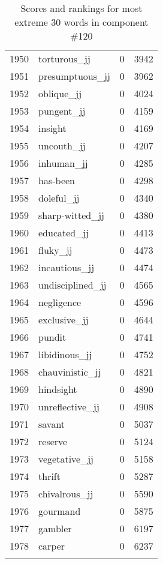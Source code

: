 \begin{longtable}[!htbp]{| rlr@{.}l |}
    1950 & torturous\_jj & 0 & 3942 \\
    1951 & presumptuous\_jj & 0 & 3962 \\
    1952 & oblique\_jj & 0 & 4024 \\
    1953 & pungent\_jj & 0 & 4159 \\
    1954 & insight & 0 & 4169 \\
    1955 & uncouth\_jj & 0 & 4207 \\
    1956 & inhuman\_jj & 0 & 4285 \\
    1957 & has-been & 0 & 4298 \\
    1958 & doleful\_jj & 0 & 4340 \\
    1959 & sharp-witted\_jj & 0 & 4380 \\
    1960 & educated\_jj & 0 & 4413 \\
    1961 & fluky\_jj & 0 & 4473 \\
    1962 & incautious\_jj & 0 & 4474 \\
    1963 & undisciplined\_jj & 0 & 4565 \\
    1964 & negligence & 0 & 4596 \\
    1965 & exclusive\_jj & 0 & 4644 \\
    1966 & pundit & 0 & 4741 \\
    1967 & libidinous\_jj & 0 & 4752 \\
    1968 & chauvinistic\_jj & 0 & 4821 \\
    1969 & hindsight & 0 & 4890 \\
    1970 & unreflective\_jj & 0 & 4908 \\
    1971 & savant & 0 & 5037 \\
    1972 & reserve & 0 & 5124 \\
    1973 & vegetative\_jj & 0 & 5158 \\
    1974 & thrift & 0 & 5287 \\
    1975 & chivalrous\_jj & 0 & 5590 \\
    1976 & gourmand & 0 & 5875 \\
    1977 & gambler & 0 & 6197 \\
    1978 & carper & 0 & 6237 \\
    \hline
    \caption{Scores and rankings for most extreme 30 words in component \#120} \\
\end{longtable}
